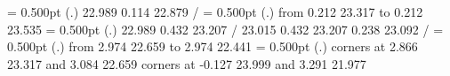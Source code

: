 {{}%
%
%
\linethickness= 0.500pt
\setplotsymbol ({\thinlinefont .})
{\color[rgb]{0,0,0} 22.989  0.114 22.879 /
}%
%
%
\linethickness= 0.500pt
\setplotsymbol ({\thinlinefont .})
{\color[rgb]{0,0,0}\putrule from  0.212 23.317 to  0.212 23.535
}%
%
%
\linethickness= 0.500pt
\setplotsymbol ({\thinlinefont .})
{\color[rgb]{0,0,0} 22.989  0.432 23.207 /
%
%
 23.015  0.432 23.207  0.238 23.092 /
%
}%
%
%
\linethickness= 0.500pt
\setplotsymbol ({\thinlinefont .})
{\color[rgb]{0,0,0}\putrule from  2.974 22.659 to  2.974 22.441
}%
%
%
\linethickness= 0.500pt
\setplotsymbol ({\thinlinefont .})
{\color[rgb]{0,0,0}\color[rgb]{0,0,0}\putrectangle corners at  2.866 23.317 and  3.084 22.659
}%
\linethickness=0pt
\putrectangle corners at -0.127 23.999 and  3.291 21.977
\endpicture}
